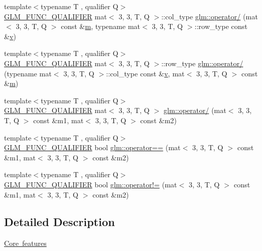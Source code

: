 \begin{DoxyCompactItemize}
\item 
{\footnotesize template$<$typename T , qualifier Q$>$ }\\\mbox{\hyperlink{setup_8hpp_a33fdea6f91c5f834105f7415e2a64407}{G\+L\+M\+\_\+\+F\+U\+N\+C\+\_\+\+Q\+U\+A\+L\+I\+F\+I\+ER}} mat$<$ 3, 3, T, Q $>$\+::col\+\_\+type \mbox{\hyperlink{namespaceglm_a96e1564e3a533655fb4b7feddcc2fcd4}{glm\+::operator/}} (mat$<$ 3, 3, T, Q $>$ const \&\mbox{\hyperlink{_s_d_l__opengl__glext_8h_af593500c283bf1a787a6f947f503a5c2}{m}}, typename mat$<$ 3, 3, T, Q $>$\+::row\+\_\+type const \&\mbox{\hyperlink{_s_d_l__opengl_8h_a10a82eabcb59d2fcd74acee063775f90}{v}})
\item 
{\footnotesize template$<$typename T , qualifier Q$>$ }\\\mbox{\hyperlink{setup_8hpp_a33fdea6f91c5f834105f7415e2a64407}{G\+L\+M\+\_\+\+F\+U\+N\+C\+\_\+\+Q\+U\+A\+L\+I\+F\+I\+ER}} mat$<$ 3, 3, T, Q $>$\+::row\+\_\+type \mbox{\hyperlink{namespaceglm_a4edac2acd652388ae12afca385e789f3}{glm\+::operator/}} (typename mat$<$ 3, 3, T, Q $>$\+::col\+\_\+type const \&\mbox{\hyperlink{_s_d_l__opengl_8h_a10a82eabcb59d2fcd74acee063775f90}{v}}, mat$<$ 3, 3, T, Q $>$ const \&\mbox{\hyperlink{_s_d_l__opengl__glext_8h_af593500c283bf1a787a6f947f503a5c2}{m}})
\item 
{\footnotesize template$<$typename T , qualifier Q$>$ }\\\mbox{\hyperlink{setup_8hpp_a33fdea6f91c5f834105f7415e2a64407}{G\+L\+M\+\_\+\+F\+U\+N\+C\+\_\+\+Q\+U\+A\+L\+I\+F\+I\+ER}} mat$<$ 3, 3, T, Q $>$ \mbox{\hyperlink{namespaceglm_a16b241d81cd3ddeb9bb5d4c5c46d2a7c}{glm\+::operator/}} (mat$<$ 3, 3, T, Q $>$ const \&m1, mat$<$ 3, 3, T, Q $>$ const \&m2)
\item 
{\footnotesize template$<$typename T , qualifier Q$>$ }\\\mbox{\hyperlink{setup_8hpp_a33fdea6f91c5f834105f7415e2a64407}{G\+L\+M\+\_\+\+F\+U\+N\+C\+\_\+\+Q\+U\+A\+L\+I\+F\+I\+ER}} bool \mbox{\hyperlink{namespaceglm_a362fcecade24bee02d0d2c337bf7a403}{glm\+::operator==}} (mat$<$ 3, 3, T, Q $>$ const \&m1, mat$<$ 3, 3, T, Q $>$ const \&m2)
\item 
{\footnotesize template$<$typename T , qualifier Q$>$ }\\\mbox{\hyperlink{setup_8hpp_a33fdea6f91c5f834105f7415e2a64407}{G\+L\+M\+\_\+\+F\+U\+N\+C\+\_\+\+Q\+U\+A\+L\+I\+F\+I\+ER}} bool \mbox{\hyperlink{namespaceglm_a85363a0968592f80c11f86296d14471d}{glm\+::operator!=}} (mat$<$ 3, 3, T, Q $>$ const \&m1, mat$<$ 3, 3, T, Q $>$ const \&m2)
\end{DoxyCompactItemize}


\subsection{Detailed Description}
\mbox{\hyperlink{group__core}{Core features}} 